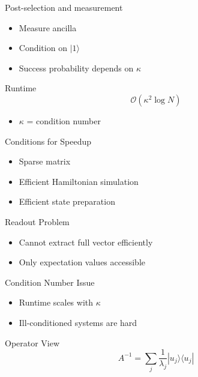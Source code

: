 \documentclass{beamer}
\begin{document}
\begin{frame}{Post-selection and measurement}
\begin{itemize}
\item Measure ancilla
\item Condition on $|1\rangle$
\item Success probability depends on $\kappa$
\end{itemize}
\end{frame}


\begin{frame}{Runtime}
\[
\mathcal{O}\left(\kappa^2 \log N\right)
\]
\begin{itemize}
\item $\kappa$ = condition number
\end{itemize}
\end{frame}


\begin{frame}{Conditions for Speedup}
\begin{itemize}
\item Sparse matrix
\item Efficient Hamiltonian simulation
\item Efficient state preparation
\end{itemize}
\end{frame}


\begin{frame}{Readout Problem}
\begin{itemize}
\item Cannot extract full vector efficiently
\item Only expectation values accessible
\end{itemize}
\end{frame}


\begin{frame}{Condition Number Issue}
\begin{itemize}
\item Runtime scales with $\kappa$
\item Ill-conditioned systems are hard
\end{itemize}
\end{frame}


\begin{frame}{Operator View}
\[
A^{-1} = \sum_j \frac{1}{\lambda_j} |u_j\rangle \langle u_j|
\]
\end{frame}
\end{document}
